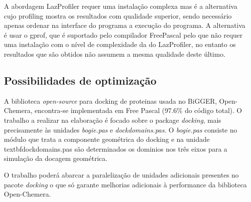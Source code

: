  A abordagem LazProfiler requer uma instalação complexa mas é a alternativa cujo profiling mostra os resultados com qualidade superior, sendo necessário apenas ordenar na interface do programa a execução do programa. A alternativa é usar o gprof, que é suportado pelo compilador FreePascal pelo que não requer uma instalação com o nível de complexidade da do LazProfiler, no entanto os resultados que são obtidos não assumem a mesma qualidade deste último.
 
 
\subsection{Possibilidades de optimização} %
\label{abordagem}
A biblioteca \textit{open-source} para docking de proteinas usada no BiGGER, Open-Chemera, encontra-se implementada em Free Pascal (97.6\% do código total). O trabalho a realizar na elaboração é focado sobre o package \textit{docking}, mais precisamente às unidades \textit{bogie.pas} e \textit{dockdomains.pas}. O \textit{bogie.pas} consiste no módulo que trata a componente geométrica do docking e na unidade textbf{dockdomains.pas} são determinados os dominios nos três eixos para a simulação da docagem geométrica.

 O trabalho poderá abarcar a paralelização de unidades adicionais presentes no pacote \textit{docking} o que só garante melhorias adicionais à performance da biblioteca Open-Chemera. 
 
